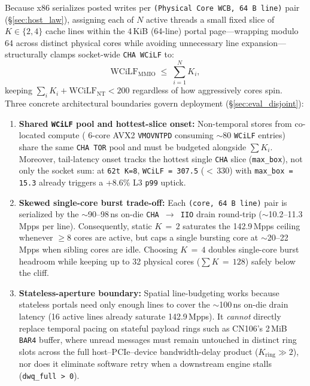 Because x86 serializes posted writes per \texttt{(Physical Core WCB, 64\,B line)} pair (\S\ref{sec:host_law}), assigning each of $N$ active threads a small fixed slice of $K \in \{2, 4\}$ cache lines within the 4\,KiB (64-line) portal page---wrapping modulo 64 across distinct physical cores while avoiding unnecessary line expansion---structurally clamps socket-wide \texttt{CHA WCiLF} to:
\begin{equation}
  \text{WCiLF}_{\text{MMIO}} \;\le\; \sum_{i=1}^{N} K_i,
  \label{eq:partition}
\end{equation}
keeping $\sum_i K_i + \text{WCiLF}_{\text{NT}} < 200$ regardless of how aggressively cores spin. Three concrete architectural boundaries govern deployment (\S\ref{sec:eval_disjoint}):
\begin{enumerate}
  \item \textbf{Shared \texttt{WCiLF} pool and hottest-slice onset:} Non-temporal stores from co-located compute (\eg{} 6-core AVX2 \texttt{VMOVNTPD} consuming $\sim$80 \texttt{WCiLF} entries) share the same \texttt{CHA TOR} pool and must be budgeted alongside $\sum K_i$. Moreover, tail-latency onset tracks the hottest single \texttt{CHA} slice (\texttt{max\_box}), not only the socket sum: at \texttt{62t K=8}, \texttt{WCiLF\,=\,307.5} ($<$\,330) with \texttt{max\_box\,=\,15.3} already triggers a +8.6\% L3 \texttt{p99} uptick.
  \item \textbf{Skewed single-core burst trade-off:} Each \texttt{(core, 64\,B line)} pair is serialized by the $\sim$90--98\,ns on-die \texttt{CHA\,$\to$\,IIO} drain round-trip ($\sim$10.2--11.3\,Mpps per line). Consequently, static $K\,=\,2$ saturates the 142.9\,Mpps ceiling whenever $\ge$8 cores are active, but caps a single bursting core at $\sim$20--22\,Mpps when sibling cores are idle. Choosing $K\,=\,4$ doubles single-core burst headroom while keeping up to 32 physical cores ($\sum K\,=\,128$) safely below the cliff.
  \item \textbf{Stateless-aperture boundary:} Spatial line-budgeting works because stateless portals need only enough lines to cover the $\sim$100\,ns on-die drain latency (16 active lines already saturate 142.9\,Mpps). It \emph{cannot} directly replace temporal pacing on stateful payload rings such as CN106's 2\,MiB \texttt{BAR4} buffer, where unread messages must remain untouched in distinct ring slots across the full host--PCIe--device bandwidth-delay product ($K_{\text{ring}} \gg 2$), nor does it eliminate software retry when a downstream engine stalls (\texttt{dwq\_full\,>\,0}).
\end{enumerate}

